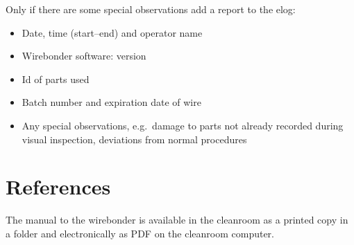 \documentclass[12pt]{unlsilabsop}
\begin{document}
Only if there are some special observations add a report to the elog:
\begin{itemize}
    \item Date, time (start--end) and operator name
    \item Wirebonder software: version
    \item Id of parts used
    \item Batch number and expiration date of wire
    \item Any special observations, e.g.~damage to parts not already recorded during visual inspection, deviations from normal procedures
\end{itemize}


\section{References}

The manual to the wirebonder is available in the cleanroom as a printed copy in a folder and electronically as PDF on the cleanroom computer.
\end{document}
